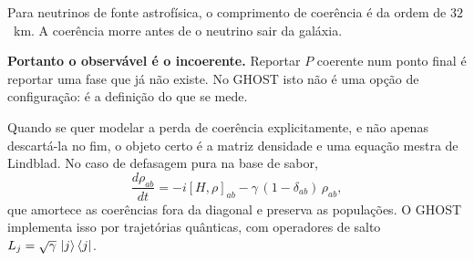 \begin{conceito}
Para neutrinos de fonte astrofísica, o comprimento de coerência é da ordem de
$32$~km. A coerência morre antes de o neutrino sair da galáxia.

\medskip
\textbf{Portanto o observável é o incoerente.} Reportar $P$ coerente num ponto
final é reportar uma fase que já não existe. No GHOST isto não é uma opção de
configuração: é a definição do que se mede.
\end{conceito}

Quando se quer modelar a perda de coerência explicitamente, e não apenas
descartá-la no fim, o objeto certo é a matriz densidade e uma equação mestra de
Lindblad. No caso de defasagem pura na base de sabor,
\begin{equation}
  \frac{d\rho_{ab}}{dt} = -i[H,\rho]_{ab} - \gamma\,(1-\delta_{ab})\,\rho_{ab},
\label{eq:lindblad}
\end{equation}
que amortece as coerências fora da diagonal e preserva as populações. O GHOST
implementa isso por trajetórias quânticas, com operadores de salto
$L_j = \sqrt{\gamma}\,\left|j\right\rangle\left\langle j\right|$.
